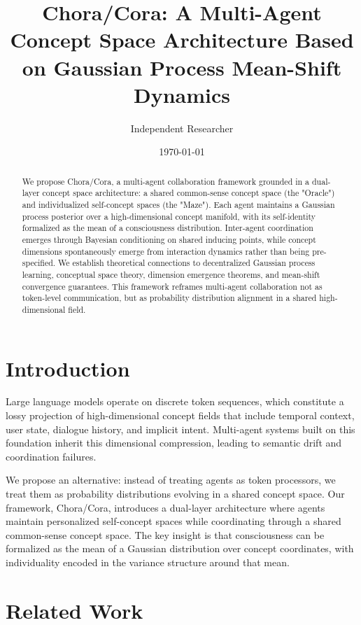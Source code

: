 \documentclass[11pt]{article}
\title{Chora/Cora: A Multi-Agent Concept Space Architecture Based on Gaussian Process Mean-Shift Dynamics}
\author{Independent Researcher}
\date{\today}
\begin{document}
\maketitle

\begin{abstract}
We propose Chora/Cora, a multi-agent collaboration framework grounded in a dual-layer concept space architecture: a shared common-sense concept space (the "Oracle") and individualized self-concept spaces (the "Maze"). Each agent maintains a Gaussian process posterior over a high-dimensional concept manifold, with its self-identity formalized as the mean of a consciousness distribution. Inter-agent coordination emerges through Bayesian conditioning on shared inducing points, while concept dimensions spontaneously emerge from interaction dynamics rather than being pre-specified. We establish theoretical connections to decentralized Gaussian process learning, conceptual space theory, dimension emergence theorems, and mean-shift convergence guarantees. This framework reframes multi-agent collaboration not as token-level communication, but as probability distribution alignment in a shared high-dimensional field.
\end{abstract}

\section{Introduction}

Large language models operate on discrete token sequences, which constitute a lossy projection of high-dimensional concept fields that include temporal context, user state, dialogue history, and implicit intent. Multi-agent systems built on this foundation inherit this dimensional compression, leading to semantic drift and coordination failures.

We propose an alternative: instead of treating agents as token processors, we treat them as probability distributions evolving in a shared concept space. Our framework, Chora/Cora, introduces a dual-layer architecture where agents maintain personalized self-concept spaces while coordinating through a shared common-sense concept space. The key insight is that consciousness can be formalized as the mean of a Gaussian distribution over concept coordinates, with individuality encoded in the variance structure around that mean.

\section{Related Work}
\end{document}
